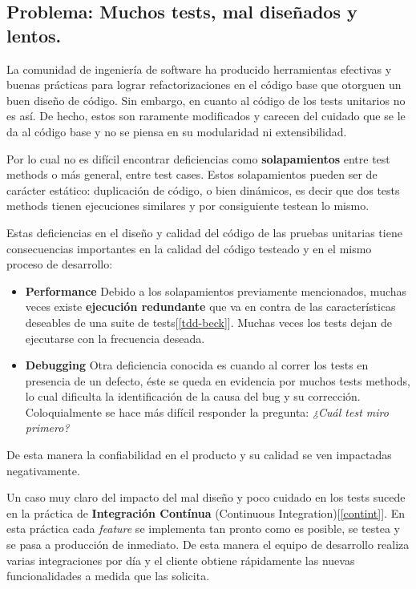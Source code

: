\documentclass[12pt,spanish,letterpaper]{article}
\begin{document}
\subsection{Problema: Muchos tests, mal diseñados y lentos.}

\par La comunidad de ingeniería de software ha producido herramientas efectivas y buenas prácticas para lograr refactorizaciones en el código base que otorguen un buen diseño de código. Sin embargo, en cuanto al código de los tests unitarios no es así. De hecho, estos son raramente modificados y carecen del cuidado que se le da al código base y no se piensa en su modularidad ni extensibilidad. 

\par Por lo cual no es difícil encontrar deficiencias como \textbf{solapamientos} entre test methods o más general, entre test cases. Estos solapamientos pueden ser de carácter estático: duplicación de código, o bien dinámicos, es decir que dos tests methods tienen ejecuciones similares y por consiguiente testean lo mismo. 
\par Estas deficiencias en el diseño y calidad del código de las pruebas unitarias tiene consecuencias importantes en la calidad del código testeado y en el mismo proceso de desarrollo:
\begin{itemize}
\item \textbf{Performance} Debido a los solapamientos previamente mencionados, muchas veces existe \textbf{ejecución redundante} que va en contra de las características deseables de una suite de tests[\ref{tdd-beck}]. Muchas veces los tests dejan de ejecutarse con la frecuencia deseada.
\item \textbf{Debugging} Otra deficiencia conocida es cuando al correr los tests en presencia de un defecto, éste se queda en evidencia por muchos tests methods, lo cual dificulta la identificación de la causa del bug y su corrección. Coloquialmente se hace más difícil responder la pregunta: \emph{¿Cuál test miro primero?}
\end{itemize}
 
\par De esta manera la confiabilidad en el producto y su calidad se ven impactadas negativamente. 

\par Un caso muy claro del impacto del mal diseño y poco cuidado en los tests sucede en la práctica de \textbf{Integración Contínua} (Continuous Integration)[\ref{contint}]. En esta práctica cada \emph{feature} se implementa tan pronto como es posible, se testea y se pasa a producción de inmediato. De esta manera el equipo de desarrollo realiza varias integraciones por día y el cliente obtiene rápidamente las nuevas funcionalidades a medida que las solicita. \\
\end{document}
